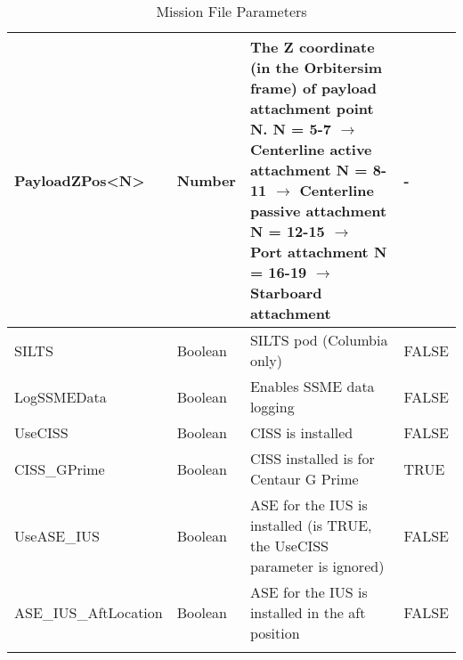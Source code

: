 \documentclass[Space_Shuttle_Ultra_Manual.tex]{subfiles}
\begin{document}
\begin{longtable}{|l|p{1.5cm}|p{7.5cm}|p{2.0cm}|}
	\hline
	\rule{0pt}{2ex}
	PayloadZPos<N> & Number & The Z coordinate (in the Orbitersim frame) of payload attachment point N.\newline
N = 5-7 $\rightarrow$ Centerline active attachment\newline
N = 8-11 $\rightarrow$ Centerline passive attachment\newline
N = 12-15 $\rightarrow$ Port attachment\newline
N = 16-19 $\rightarrow$ Starboard attachment & - \\
	\hline
	\rule{0pt}{2ex}
	SILTS & Boolean & SILTS pod (Columbia only) & FALSE\\
	\hline
	\rule{0pt}{2ex}
	LogSSMEData & Boolean & Enables SSME data logging & FALSE\\
	\hline
	\rule{0pt}{2ex}
	UseCISS & Boolean & CISS is installed & FALSE\\
	\hline
	\rule{0pt}{2ex}
	CISS\_GPrime & Boolean & CISS installed is for Centaur G Prime & TRUE\\
	\hline
	\rule{0pt}{2ex}
	UseASE\_IUS & Boolean & ASE for the IUS is installed (is TRUE, the UseCISS parameter is ignored) & FALSE\\
	\hline
	\rule{0pt}{2ex}
	ASE\_IUS\_AftLocation & Boolean & ASE for the IUS is installed in the aft position & FALSE\\
	\hline
	\caption{Mission File Parameters}
  \label{tab:Mission_File}
	\end{longtable}
\end{document}
